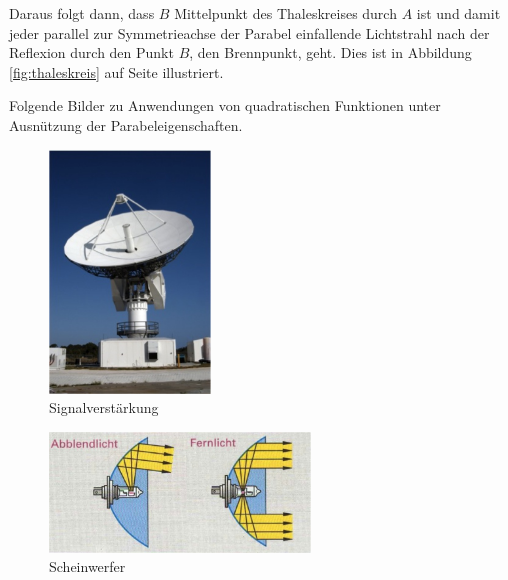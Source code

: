 \documentclass[%
11pt,%
twoside,%
titlepage,%
german,%
headsepline%
]{scrartcl}
\begin{document}
Daraus folgt dann, dass $B$ Mittelpunkt des Thaleskreises durch $A$ ist und damit jeder parallel zur Symmetrieachse der Parabel einfallende Lichtstrahl nach der Reflexion durch den Punkt $B$, den Brennpunkt, geht. Dies ist in Abbildung \ref{fig:thaleskreis} auf Seite \pageref{fig:thaleskreis} illustriert.

Folgende Bilder zu Anwendungen von quadratischen Funktionen unter Ausn\"utzung der Parabeleigenschaften.

\begin{figure}
\centering
\includegraphics[width=0.382\textwidth]{pictures/radar}
\caption{Signalverst\"arkung}
\end{figure}

\begin{figure}
\centering
\includegraphics[width=0.618\textwidth]{pictures/scheinwerfer}
\caption{Scheinwerfer}
\end{figure}

\pagebreak
\end{document}
